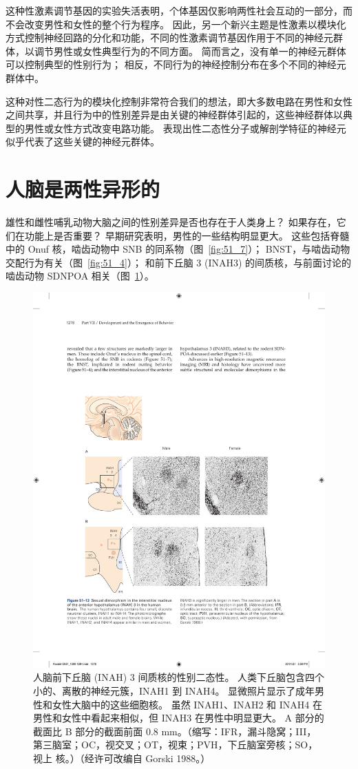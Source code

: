 这种性激素调节基因的实验失活表明，个体基因仅影响两性社会互动的一部分，而不会改变男性和女性的整个行为程序。
因此，另一个新兴主题是性激素以模块化方式控制神经回路的分化和功能，不同的性激素调节基因作用于不同的神经元群体，以调节男性或女性典型行为的不同方面。
简而言之，没有单一的神经元群体可以控制典型的性别行为；
相反，不同行为的神经控制分布在多个不同的神经元群体中。


这种对性二态行为的模块化控制非常符合我们的想法，即大多数电路在男性和女性之间共享，并且行为中的性别差异是由关键的神经群体引起的，这些神经群体以典型的男性或女性方式改变电路功能。
表现出性二态性分子或解剖学特征的神经元似乎代表了这些关键的神经元群体。



\section{人脑是两性异形的}

雄性和雌性哺乳动物大脑之间的性别差异是否也存在于人类身上？
如果存在，它们在功能上是否重要？
早期研究表明，男性的一些结构明显更大。
这些包括脊髓中的 Onuf 核，啮齿动物中 SNB 的同系物（图~\ref{fig:51_7}）；
BNST，与啮齿动物交配行为有关（图~\ref{fig:51_4}）；
和前下丘脑 3 (INAH3) 的间质核，与前面讨论的啮齿动物 SDNPOA 相关（图~\ref{fig:51_13}）。


\begin{figure}[htbp]
	\centering
	\includegraphics[width=0.8\linewidth]{chap51/fig_51_13}
	\caption{人脑前下丘脑 (INAH) 3 间质核的性别二态性。 人类下丘脑包含四个小的、离散的神经元簇，INAH1 到 INAH4。 显微照片显示了成年男性和女性大脑中的这些细胞核。 虽然 INAH1、INAH2 和 INAH4 在男性和女性中看起来相似，但 INAH3 在男性中明显更大。 A 部分的截面比 B 部分的截面前面 0.8 mm。（缩写：IFR，漏斗隐窝；III，第三脑室；OC，视交叉；OT，视束；PVH，下丘脑室旁核；SO，视上 核。）（经许可改编自 Gorski 1988。）}
	\label{fig:51_13}
\end{figure}


